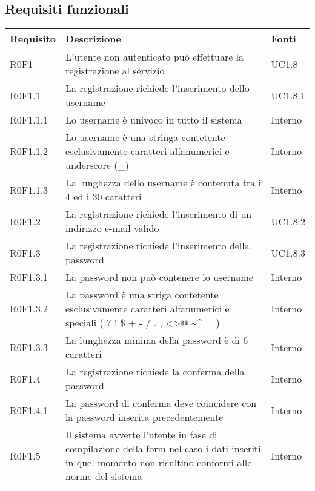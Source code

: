 \subsection{Requisiti funzionali}

\begin{center}

	\def\arraystretch{1.5}
	\bgroup
	\begin{longtable}{| p{2cm} | p{8cm} | p{2cm} |}

		\hline
		\textbf{Requisito} & \textbf{Descrizione} & \textbf{Fonti} \\
		\hline

		R0F1  &  L'utente non autenticato può effettuare la registrazione al servizio  &  UC1.8 \\
		\hline
		R0F1.1  &  La registrazione richiede l'inserimento dello username  &  UC1.8.1 \\
		\hline
		R0F1.1.1  &  Lo username è univoco in tutto il sistema  &  Interno \\
		\hline
		R0F1.1.2  &  Lo username è una stringa contetente esclusivamente caratteri alfanumerici e underscore (\_)  &  Interno \\
		\hline
		R0F1.1.3  &  La lunghezza dello username è contenuta tra i 4 ed i 30 caratteri  &  Interno \\
		\hline
		R0F1.2  &  La registrazione richiede l'inserimento di un indirizzo e-mail valido &  UC1.8.2 \\
		\hline
		R0F1.3  &  La registrazione richiede l'inserimento della password  &  UC1.8.3 \\
		\hline
		R0F1.3.1  &  La password non può contenere lo username  &  Interno \\
		\hline
		R0F1.3.2  &  La password è una striga contetente esclusivamente caratteri alfanumerici e speciali ( ? ! \$ + - / . , \textless \textgreater $@$ \textasciitilde \^{} \_ )  &  Interno \\
		\hline
		R0F1.3.3  &  La lunghezza minima della password è di 6 caratteri  &  Interno \\
		\hline
		R0F1.4  &  La registrazione richiede la conferma della password  &  Interno \\
		\hline
		R0F1.4.1  &  La password di conferma deve coincidere con la password inserita precedentemente  &  Interno \\
		\hline
		R0F1.5  &  Il sistema avverte l'utente in fase di compilazione della form nel caso i dati inseriti in quel momento non risultino conformi alle norme del sistema  &  Interno \\

\end{longtable}
\end{center}
